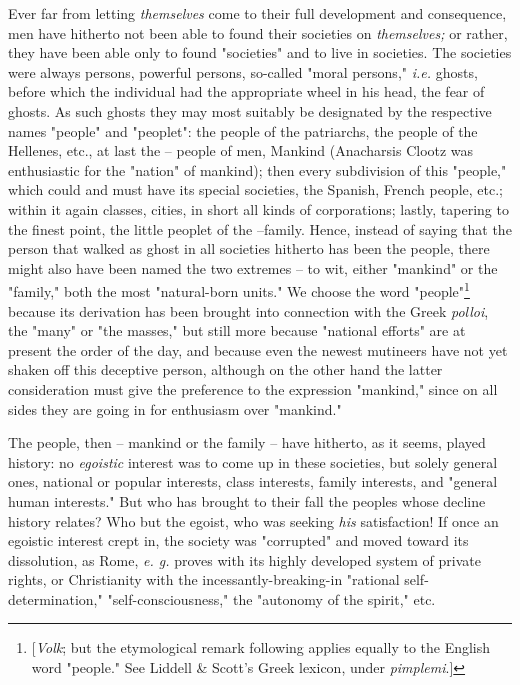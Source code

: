 Ever far from letting \textit{themselves} come to their full development and 
consequence, men have hitherto not been able to found their societies on 
\textit{themselves;} or rather, they have been able only to found 
"{}societies"{} and to live in societies. The societies were always persons, 
powerful persons, so-called "{}moral persons,"{} \textit{i.e.} ghosts, before 
which the individual had the appropriate wheel in his head, the fear of 
ghosts. As such ghosts they may most suitably be designated by the respective 
names "{}people"{} and "{}peoplet"{}: the people of the patriarchs, the people 
of the Hellenes, etc., at last the -- people of men, Mankind (Anacharsis 
Clootz was enthusiastic for the "{}nation"{} of mankind); then every 
subdivision of this "{}people,"{} which could and must have its special 
societies, the Spanish, French people, etc.; within it again classes, cities, 
in short all kinds of corporations; lastly, tapering to the finest point, the 
little peoplet of the --family. Hence, instead of saying that the person that 
walked as ghost in all societies hitherto has been the people, there might 
also have been named the two extremes -- to wit, either "{}mankind"{} or the 
"{}family,"{} both the most "{}natural-born units."{} We choose the word 
"{}people"{}\footnote{[\textit{Volk}; but the etymological remark following 
applies equally to the English word "{}people."{} See Liddell \& Scott's Greek 
lexicon, under \textit{pimplemi}.]} because its derivation has been brought 
into connection with the Greek \textit{polloi}, the "{}many"{} or "{}the 
masses,"{} but still more because "{}national efforts"{} are at present the 
order of the day, and because even the newest mutineers have not yet shaken 
off this deceptive person, although on the other hand the latter consideration 
must give the preference to the expression "{}mankind,"{} since on all sides 
they are going in for enthusiasm over "{}mankind."{}

The people, then -- mankind or the family -- have hitherto, as it seems, 
played history: no \textit{egoistic} interest was to come up in these 
societies, but solely general ones, national or popular interests, class 
interests, family interests, and "{}general human interests."{} But who has 
brought to their fall the peoples whose decline history relates? Who but the 
egoist, who was seeking \textit{his} satisfaction! If once an egoistic 
interest crept in, the society was "{}corrupted"{} and moved toward its 
dissolution, as Rome, \textit{e. g.} proves with its highly developed system 
of private rights, or Christianity with the incessantly-breaking-in 
"{}rational self-determination,"{} "{}self-consciousness,"{} the "{}autonomy 
of the spirit,"{} etc.

